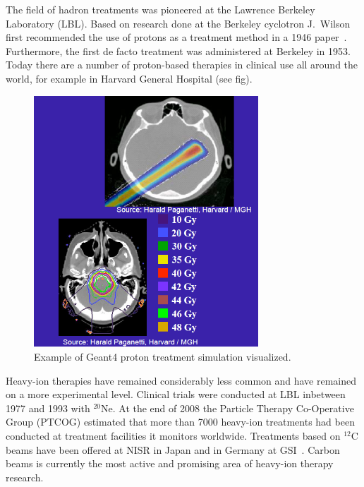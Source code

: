 The field of hadron treatments was pioneered at the Lawrence Berkeley Laboratory (LBL). Based on research done at the Berkeley cyclotron J.~Wilson first recommended the use of protons as a treatment method in a 1946 paper~\cite{RW46}. Furthermore, the first de facto treatment was administered at Berkeley in 1953. Today there are a number of proton-based therapies in clinical use all around the world, for example in Harvard General Hospital (see fig). %
\begin{figure}[h]
\begin{center}
\includegraphics[width=0.75\textwidth]{images/HarvardHadronTreatment.png}  
\caption{\label{fig:HarvardHadron} Example of Geant4 proton treatment simulation visualized.} 
\end{center}
\end{figure} 
Heavy-ion therapies have remained considerably less common and have remained on a more experimental level. Clinical trials were conducted at LBL inbetween 1977 and 1993 with $^{20}$Ne. At the end of 2008 the Particle Therapy Co-Operative  Group (PTCOG) estimated that more than 7000 heavy-ion treatments had been conducted at treatment facilities it monitors worldwide. Treatments based on $^{12}$C beams have been offered at NISR in Japan and in Germany at GSI~\cite{PTCOGstat}. Carbon beams is currently the most active and promising area of heavy-ion therapy research. 

